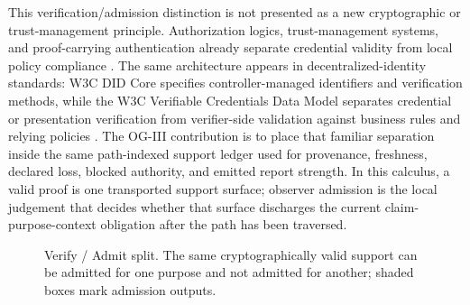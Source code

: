 \documentclass[11pt,twoside]{article}
\theoremstyle{definition}
\newcommand{\CryptSupp}{\mathrm{CryptSupp}}
\newcommand{\Admit}{\mathrm{Admit}}
\newcommand{\Verify}{\mathrm{Verify}}
\newcommand{\ctx}{\mathrm{ctx}}
\newcommand{\underdetermined}{\mathrm{underdetermined}}
\begin{document}
This verification/admission distinction is not presented as a new
cryptographic or trust-management principle. Authorization logics,
trust-management systems, and proof-carrying authentication already separate
credential validity from local policy compliance
\cite{abadi_access_control_1993,blaze_trust_management_1996,appel_pca_1999}.
The same architecture appears in decentralized-identity standards: W3C DID
Core specifies controller-managed identifiers and verification methods, while
the W3C Verifiable Credentials Data Model separates credential or presentation
verification from verifier-side validation against business rules and relying
policies \cite{w3c_did_core_2022,w3c_vc_data_model_2025}.
The OG-III contribution is to place that familiar separation inside the same
path-indexed support ledger used for provenance, freshness, declared loss,
blocked authority, and emitted report strength. In this calculus, a valid proof
is one transported support surface; observer admission is the local judgement
that decides whether that surface discharges the current
claim-purpose-context obligation after the path has been traversed.

\begin{figure}[ht]
\centering
{}
\caption{Verify / Admit split. The same cryptographically valid support can be admitted for one purpose and not admitted for another; shaded boxes mark admission outputs.}
\label{fig:verify-admit}
\end{figure}
\end{document}
